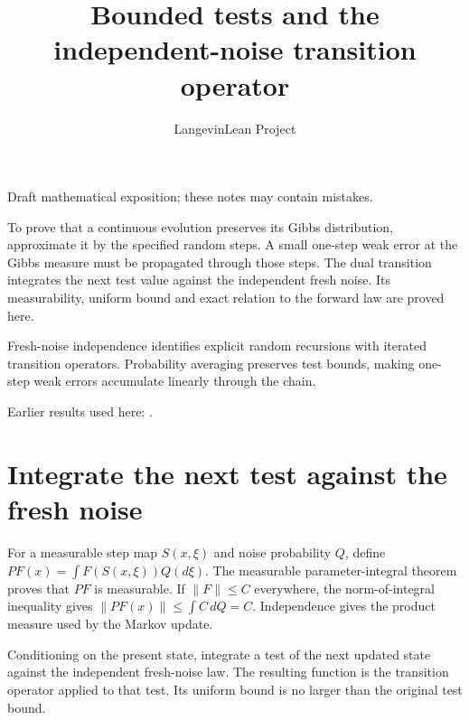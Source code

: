 \documentclass[11pt,a4paper]{article}
\title{\texorpdfstring{Bounded tests and the independent-noise transition operator}{Bounded tests and the independent-noise transition operator}}
\author{LangevinLean Project}
\date{}
\begin{document}
\maketitle
Draft mathematical exposition; these notes may contain mistakes.


To prove that a continuous evolution preserves its Gibbs distribution, approximate it by the specified random steps. A small one-step weak error at the Gibbs measure must be propagated through those steps. The dual transition integrates the next test value against the independent fresh noise. Its measurability, uniform bound and exact relation to the forward law are proved here.



Fresh-noise independence identifies explicit random recursions with iterated transition operators. Probability averaging preserves test bounds, making one-step weak errors accumulate linearly through the chain.



Earlier results used here: \cite[Section~3.33]{LangevinLean2026ULASC}.

\section{\texorpdfstring{Integrate the next test against the fresh noise}{Integrate the next test against the fresh noise}}


For a measurable step map \(S(x,\xi)\) and noise probability \(Q\), define \(PF(x)=\int F(S(x,\xi))Q(d\xi)\). The measurable parameter-integral theorem proves that \(PF\) is measurable. If \(\lVert F\rVert\le C\) everywhere, the norm-of-integral inequality gives \(\lVert PF(x)\rVert\le\int C\,dQ=C\). Independence gives the product measure used by the Markov update.



Conditioning on the present state, integrate a test of the next updated state against the independent fresh-noise law. The resulting function is the transition operator applied to that test. Its uniform bound is no larger than the original test bound.
\end{document}
